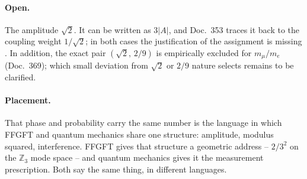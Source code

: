 \paragraph{Open.} The amplitude $\sqrt2$. It can be written as $3|A|$, and Doc.~353
traces it back to the coupling weight $1/\sqrt2$; in both cases the justification
of the assignment is missing \SM. In addition, the exact pair $(\sqrt2,\,2/9)$ is
empirically excluded for $m_\mu/m_e$ (Doc.~369); which small deviation from
$\sqrt2$ or $2/9$ nature selects remains to be clarified.


\paragraph{Placement.} That phase and probability carry the same number is the language in which
FFGFT and quantum mechanics share one structure: amplitude, modulus squared, interference. FFGFT
gives that structure a geometric address -- $2/3^2$ on the $\mathbb{Z}_3$ mode space -- and
quantum mechanics gives it the measurement prescription. Both say the same thing, in different
languages.
